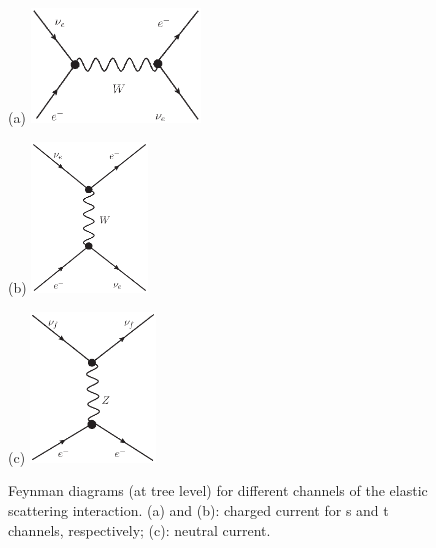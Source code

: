 \begin{figure}[htbp]
	\centering
	\begin{minipage}[t]{0.45\textwidth}{(a)}
		\centering
		\includegraphics[width=4.5cm]{charged-1.eps}
	\end{minipage}
	\begin{minipage}[t]{0.3\textwidth}{(b)}
		\centering
		\includegraphics[height=4cm]{charged.eps}
	\end{minipage}
	\begin{minipage}[t]{0.4\textwidth}{(c)}
		\centering
		\includegraphics[height=4cm]{neutral.eps}
	\end{minipage}
	\caption{Feynman diagrams (at tree level) for different channels of the elastic scattering interaction. (a) and (b): charged current for s and t channels, respectively; (c): neutral current.}
	\label{feynman-es}
\end{figure}


